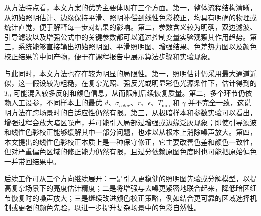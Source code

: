 \documentclass[10pt,twocolumn,letterpaper]{article}
\begin{document}
从方法特点看，本文方案的优势主要体现在三个方面。第一，整体流程结构清晰，从初始照明估计、边缘保持平滑、照明补偿到线性色彩校正，均具有明确的物理或统计直觉，便于解释每一步对结果的影响。第二，参数含义较为明确，双边滤波、引导滤波以及增强公式中的关键参数都可以通过控制变量实验观察其作用趋势。第三，系统能够直接输出初始照明图、平滑照明图、增强结果、色差热力图以及颜色校正结果等中间产物，便于在课程报告中展示算法步骤和实验现象。

与此同时，本文方法也存在较为明显的局限性。第一，照明估计仍采用最大通道近似，这一假设较为粗糙，在复杂光照、强反光或明显彩色光源条件下，估计得到的 $T_0$ 可能混入较多反射和颜色信息，从而限制后续恢复质量。第二，多个环节仍依赖人工设参，不同样本上的最优 $d$、$\sigma_{color}$、$r$、$\epsilon$、$T_{\min}$ 和 $\gamma$ 并不完全一致，这说明方法在跨场景时的自适应性仍然有限。第三，从极暗样本和参数实验可以看出，增强过程会放大暗区噪声，并可能引入局部过增强或边缘泛灰现象；即使引导滤波和线性色彩校正能够缓解其中一部分问题，也难以从根本上消除噪声放大。第四，本文提出的线性色彩校正本质上是一种保守修正，它主要改善色差和颜色一致性，但对严重偏色区域的修正能力仍然有限，且过分依赖原图色度时也可能把原始偏色一并带回结果中。

后续工作可从三个方向继续展开：一是引入更稳健的照明图先验或分解模型，以提高复杂场景下的亮度估计精度；二是将增强与去噪更紧密地联合起来，降低暗区细节恢复时的噪声放大；三是继续改进颜色校正策略，例如结合更可靠的区域选择机制或更强的颜色先验，以进一步提升复杂场景中的色彩自然性。

{\small


}
\end{document}
